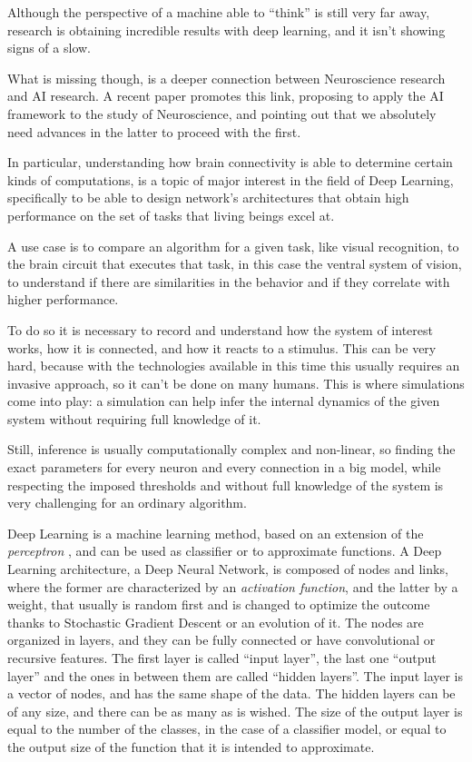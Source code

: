 Although the perspective of a machine able to ``think'' is still very far away, research is obtaining incredible results with deep learning, and it isn't showing signs of a slow.

What is missing though, is a deeper connection between Neuroscience research and AI research. A recent paper \cite{richards2019deep} promotes this link, proposing to apply the AI framework to the study of Neuroscience, and pointing out that we absolutely need advances in the latter to proceed with the first.

In particular, understanding how brain connectivity is able to determine certain kinds of computations, is a topic of major interest in the field of Deep Learning, specifically to be able to design network's architectures that obtain high performance on the set of tasks that living beings excel at.

A use case is to compare an algorithm for a given task, like visual recognition, to the brain circuit that executes that task, in this case the ventral system of vision, to understand if there are similarities in the behavior and if they correlate with higher performance.

To do so it is necessary to record and understand how the system of interest works, how it is connected, and how it reacts to a stimulus. This can be very hard, because with the technologies available in this time this usually requires an invasive approach, so it can't be done on many humans. This is where simulations come into play: a simulation can help infer the internal dynamics of the given system without requiring full knowledge of it. 

Still, inference is usually computationally complex and non-linear, so finding the exact parameters for every neuron and every connection in a big model, while respecting the imposed thresholds and without full knowledge of the system is very challenging for an ordinary algorithm. 

Deep Learning is a machine learning method, based on an extension of the \emph{perceptron} \cite{rosenblatt1958perceptron}, and can be used as classifier or to approximate functions. A Deep Learning architecture, a Deep Neural Network, is composed of nodes and links, where the former are characterized by an \emph{activation function}, and the latter by a weight, that usually is random first and is changed to optimize the outcome thanks to Stochastic Gradient Descent \cite{robbins1951stochastic} or an evolution of it. The nodes are organized in layers, and they can be fully connected or have convolutional or recursive features. The first layer is called ``input layer'', the last one ``output layer'' and the ones in between them are called ``hidden layers''. 
The input layer is a vector of nodes, and has the same shape of the data. The hidden layers can be of any size, and there can be as many as is wished. The size of the output layer is equal to the number of the classes, in the case of a classifier model, or equal to the output size of the function that it is intended to approximate.

